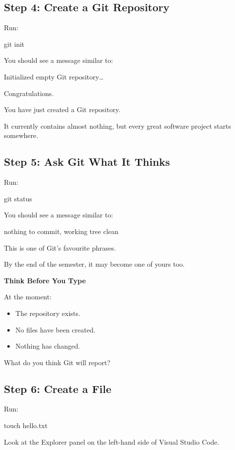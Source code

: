\documentclass{csc2059practical}
\begin{document}
\subsection{Step 4: Create a Git Repository}
Run:

\begin{terminalplain}
git init
\end{terminalplain}
You should see a message similar to:

\begin{terminalplain}
Initialized empty Git repository\ldots{}
\end{terminalplain}
Congratulations.

You have just created a Git repository.

It currently contains almost nothing, but every great software project starts somewhere.

\subsection{Step 5: Ask Git What It Thinks}
Run:

\begin{terminalplain}
git status
\end{terminalplain}
You should see a message similar to:

\begin{terminalplain}
nothing to commit, working tree clean
\end{terminalplain}
This is one of Git's favourite phrases.

By the end of the semester, it may become one of yours too.

\begin{reflectionbox}
\textbf{Think Before You Type}\par
\medskip
At the moment:
\begin{itemize}
  \item The repository exists.
  \item No files have been created.
  \item Nothing has changed.
\end{itemize}
What do you think Git will report?
\end{reflectionbox}

\subsection{Step 6: Create a File}
Run:

\begin{terminalplain}
touch hello.txt
\end{terminalplain}
Look at the Explorer panel on the left-hand side of Visual Studio Code.
\end{document}
